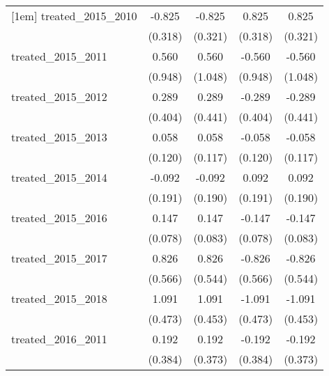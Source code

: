{\begin{tabular}{l*{4}{c}}
[1em]
treated\_2015\_2010&      -0.825\sym{**} &      -0.825\sym{*}  &       0.825\sym{**} &       0.825\sym{*}  \\
            &     (0.318)         &     (0.321)         &     (0.318)         &     (0.321)         \\
[1em]
treated\_2015\_2011&       0.560         &       0.560         &      -0.560         &      -0.560         \\
            &     (0.948)         &     (1.048)         &     (0.948)         &     (1.048)         \\
[1em]
treated\_2015\_2012&       0.289         &       0.289         &      -0.289         &      -0.289         \\
            &     (0.404)         &     (0.441)         &     (0.404)         &     (0.441)         \\
[1em]
treated\_2015\_2013&       0.058         &       0.058         &      -0.058         &      -0.058         \\
            &     (0.120)         &     (0.117)         &     (0.120)         &     (0.117)         \\
[1em]
treated\_2015\_2014&      -0.092         &      -0.092         &       0.092         &       0.092         \\
            &     (0.191)         &     (0.190)         &     (0.191)         &     (0.190)         \\
[1em]
treated\_2015\_2016&       0.147         &       0.147         &      -0.147         &      -0.147         \\
            &     (0.078)         &     (0.083)         &     (0.078)         &     (0.083)         \\
[1em]
treated\_2015\_2017&       0.826         &       0.826         &      -0.826         &      -0.826         \\
            &     (0.566)         &     (0.544)         &     (0.566)         &     (0.544)         \\
[1em]
treated\_2015\_2018&       1.091\sym{*}  &       1.091\sym{*}  &      -1.091\sym{*}  &      -1.091\sym{*}  \\
            &     (0.473)         &     (0.453)         &     (0.473)         &     (0.453)         \\
[1em]
treated\_2016\_2011&       0.192         &       0.192         &      -0.192         &      -0.192         \\
            &     (0.384)         &     (0.373)         &     (0.384)         &     (0.373)         \\

\end{tabular}}
